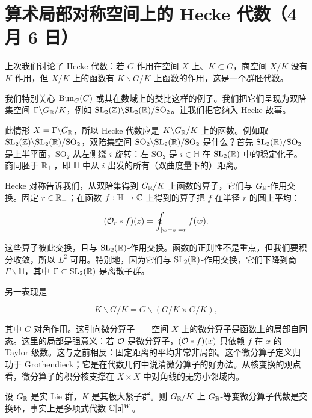 \section[算术局部对称空间上的 Hecke 代数]{算术局部对称空间上的 Hecke 代数（4 月 6 日）}


上次我们讨论了 Hecke 代数：若 $G$ 作用在空间 $X$ 上、$K\subset G$，商空间 $X/K$ 没有 $K$-作用，但 $X/K$ 上的函数有 $K\backslash G/K$ 上函数的作用，这是一个群胚代数。

我们特别关心 $\mathrm{Bun}_G(C)$ 或其在数域上的类比这样的例子。我们把它们呈现为双陪集空间 $\Gamma\backslash G_{\mathbb{R}}/K$，例如 $\mathrm{SL}_2(\mathbb{Z})\backslash \mathrm{SL}_2(\mathbb{R})/\mathrm{SO}_2$。让我们把它纳入 Hecke 故事。

此情形 $X=\Gamma\backslash G_{\mathbb{R}}$，所以 Hecke 代数应是 $K\backslash G_{\mathbb{R}}/K$ 上的函数。例如取 $\mathrm{SL}_2(\mathbb{Z})\backslash\mathrm{SL}_2(\mathbb{R})/\mathrm{SO}_2$，双陪集空间 $\mathrm{SO}_2\backslash\mathrm{SL}_2(\mathbb{R})/\mathrm{SO}_2$ 是什么？首先 $\mathrm{SL}_2(\mathbb{R})/\mathrm{SO}_2$ 是上半平面，$\mathrm{SO}_2$ 从左侧绕 $i$ 旋转：左 $\mathrm{SO}_2$ 是 $i\in\mathbb{H}$ 在 $\mathrm{SL}_2(\mathbb{R})$ 中的稳定化子。商同胚于 $\mathbb{R}_+$，即 $\mathbb{H}$ 中从 $i$ 出发的所有（双曲度量下的）距离。


Hecke 对称告诉我们，从双陪集得到 $G_{\mathbb{R}}/K$ 上函数的算子，它们与 $G_{\mathbb{R}}$-作用交换。固定 $r\in\mathbb{R}_+$；在函数 $f:\mathbb{H}\to\mathbb{C}$ 上得到的算子把 $f$ 在半径 $r$ 的圆上平均：

\[(\mathcal{O}_r*f)(z)=\oint_{|w-z|=r} f(w).\]

这些算子彼此交换，且与 $\mathrm{SL}_2(\mathbb{R})$-作用交换。函数的正则性不是重点，但我们要积分收敛，所以 $L^2$ 可用。特别地，因为它们与 $\mathrm{SL}_2(\mathbb{R})$-作用交换，它们下降到商 $\Gamma\backslash\mathbb{H}$，其中 $\Gamma\subset\mathrm{SL}_2(\mathbb{R})$ 是离散子群。

另一表现是

\[K\backslash G/K=G\backslash(G/K\times G/K),\]

其中 $G$ 对角作用。这引向微分算子——空间 $X$ 上的微分算子是函数上的局部自同态。这里的局部是强意义：若 $\mathcal{O}$ 是微分算子，$(\mathcal{O}*f)(x)$ 只依赖 $f$ 在 $x$ 的 Taylor 级数。这与之前相反：固定距离的平均非常非局部。这个微分算子定义归功于 Grothendieck；它是在代数几何中说清微分算子的好办法。从核变换的观点看，微分算子的积分核支撑在 $X\times X$ 中对角线的无穷小邻域内。

\begin{theorem}
设 $G_{\mathbb{R}}$ 是实 Lie 群，$K$ 是其极大紧子群。则 $G_{\mathbb{R}}/K$ 上 $G_{\mathbb{R}}$-等变微分算子代数是交换环，事实上是多项式代数 $\mathbb{C}[\mathfrak{a}]^W$。
\end{theorem}

